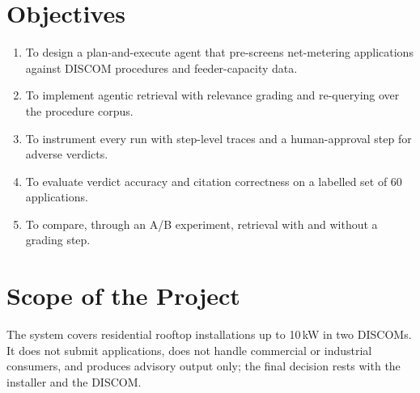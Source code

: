 \documentclass[12pt,a4paper,oneside]{report}
\newif\ifguidance
\newcommand{\guide}[1]{%
  \ifguidance
  \begin{tcolorbox}[enhanced,breakable,colback=guidebg,colframe=bmsblue,
    boxrule=0.6pt,arc=2pt,left=6pt,right=6pt,top=4pt,bottom=4pt,
    fonttitle=\bfseries\small,title={What to write here},
    before upper={\small\setstretch{1.1}}]
  #1
  \end{tcolorbox}
  \fi}
\newcommand{\dodont}[2]{%
  \ifguidance
  \begin{tcolorbox}[enhanced,breakable,sidebyside,sidebyside align=top seam,
    colback=dobg,colbacklower=dontbg,colframe=gray!60,boxrule=0.5pt,arc=2pt,
    lefthand ratio=0.5,left=5pt,right=5pt,top=4pt,bottom=4pt,
    fontupper=\small\setstretch{1.05},fontlower=\small\setstretch{1.05}]
  \textbf{\textcolor{ForestGreen}{\checkmark\ Do}}
  \begin{itemize}[leftmargin=12pt,itemsep=1pt,topsep=2pt]#1\end{itemize}
  \tcblower
  \textbf{\textcolor{BrickRed}{$\times$ Don't}}
  \begin{itemize}[leftmargin=12pt,itemsep=1pt,topsep=2pt]#2\end{itemize}
  \end{tcolorbox}
  \fi}
\newenvironment{sample}
  {\par\noindent{\footnotesize\bfseries\textcolor{BrickRed}{[SAMPLE --- replace with your own content]}}\par\color{samplecol}}
  {\par\medskip}
\begin{document}
\section{Objectives}
\guide{List three to six objectives. Each must be specific and measurable, and each must be
answered somewhere in Chapters 7--8.}
\dodont{\item Begin each objective with a verb (design, implement, evaluate).
\item Make at least one objective quantitative.}
{\item Do not write objectives you did not attempt.
\item Do not mix objectives with features.}
\begin{sample}
\begin{enumerate}[itemsep=2pt]
\item To design a plan-and-execute agent that pre-screens net-metering applications against DISCOM
procedures and feeder-capacity data.
\item To implement agentic retrieval with relevance grading and re-querying over the procedure corpus.
\item To instrument every run with step-level traces and a human-approval step for adverse verdicts.
\item To evaluate verdict accuracy and citation correctness on a labelled set of 60 applications.
\item To compare, through an A/B experiment, retrieval with and without a grading step.
\end{enumerate}
\end{sample}

\section{Scope of the Project}
\guide{State what is included and, equally important, what is excluded. Clear exclusions protect you
in the viva.}
\dodont{\item List inclusions and exclusions separately.
\item Keep the scope small enough to finish.
}
{\item Do not promise features you will not build.
\item Do not leave the scope implicit.
}
\begin{sample}
The system covers residential rooftop installations up to 10\,kW in two DISCOMs. It does not submit
applications, does not handle commercial or industrial consumers, and produces advisory output only;
the final decision rests with the installer and the DISCOM.
\end{sample}
\end{document}
